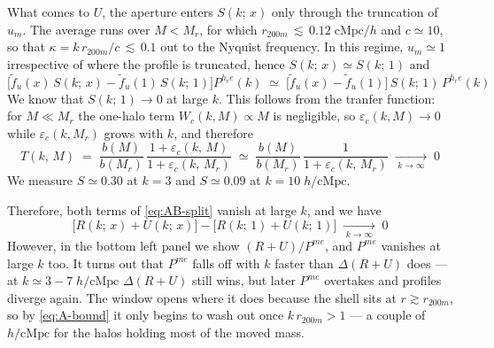 \documentclass{article}
\begin{document}
%
What comes to $U$, the aperture enters $S(k;\,x)$ only
through the truncation of $u_m$. The average runs over $M < M_r$,
for which $r_{200m} \,\lesssim\, 0.12\;\mathrm{cMpc}/h$ and $c \simeq 10$, so that
$\kappa = k\,r_{200m}/c \,\lesssim\, 0.1$ out to the Nyquist frequency. In this
regime, $u_m \simeq 1$ irrespective of where the profile is truncated, hence
$S(k;\,x) \simeq S(k;\,1)$ and
%
\begin{equation}
  \Big[
    \tilde f_u(x)\,S(k;\,x)
    - \tilde f_u(1)\,S(k;\,1)
\Big] P^{h_r e}(k)
  \;\simeq\; \Big[\tilde f_u(x) - \tilde f_u(1)\Big]\, S(k;\,1)\,
        P^{h_r e}(k)
  \label{eq:B-rescaling}
\end{equation}
%
We know that $S(k;\, 1) \to 0$ at large $k$. This follows from the tranfer function: for $M \ll M_r$ the one-halo term $W_c(k,M) \propto M$ is
negligible, so $\varepsilon_c(k,M) \to 0$ while $\varepsilon_c(k,M_r)$ grows
with $k$, and therefore
%
\begin{equation}
  T(k,\,M) \;=\; \frac{b(M)}{b(M_r)}\,
               \frac{1 + \varepsilon_c(k,\,M)}{1 + \varepsilon_c(k,\,M_r)}
         \;\simeq\; \frac{b(M)}{b(M_r)}\,
               \frac{1}{1 + \varepsilon_c(k,\,M_r)}
         \;\xrightarrow[\;k \to \infty\;]{}\; 0
  \label{eq:T-vanishes}
\end{equation}
%
We measure $S \simeq 0.30$ at $k = 3$ and $S \simeq 0.09$ at
$k = 10\;h/\mathrm{cMpc}$.
 
Therefore, both terms of \eqref{eq:AB-split} vanish at large $k$, and we have
\begin{equation}
    \Big[R(k;\,x) + U(k;\,x)\Big] - \Big[R(k;\,1) + U(k;\,1)\Big]  \;\xrightarrow[\;k \to \infty\;]{}\; 0
    \label{eq:A-absolute}
\end{equation}
However, in the bottom left panel we show $(R+U)/P^{me}$, and $P^{me}$
vanishes at large $k$ too. It turns out that $P^{me}$ falls off with $k$ faster
than $\Delta (R+U)$ does --- at $k \simeq 3-7 \; h/\mathrm{cMpc}$ $\Delta (R+U)$ still wins, 
but later $P^{me}$ overtakes and profiles diverge again. The window opens where
it does because the shell sits at $r \gtrsim r_{200m}$, so by \eqref{eq:A-bound}
it only begins to wash out once $k\,r_{200m} > 1$ --- a couple of
$h/\mathrm{cMpc}$ for the halos holding most of the moved mass.
\end{document}
